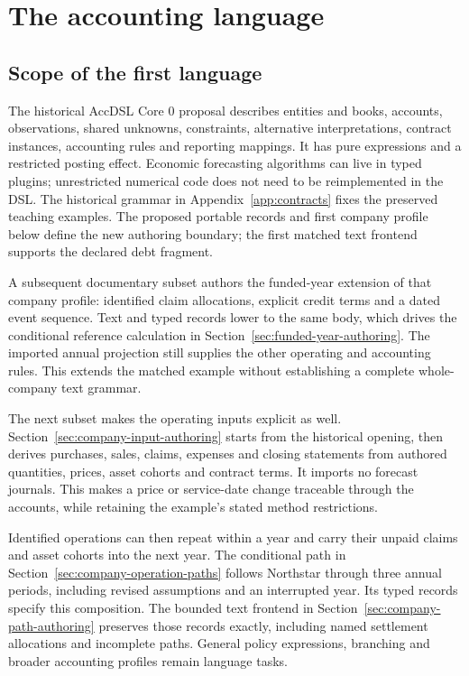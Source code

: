 \chapter{The accounting language}
\label{ch:language}

\section{Scope of the first language}

The historical AccDSL Core 0 proposal describes entities and books, accounts, observations, shared
unknowns, constraints, alternative interpretations, contract instances,
accounting rules and reporting mappings. It has pure expressions and a
restricted posting effect. Economic forecasting algorithms can live in typed
plugins; unrestricted numerical code does not need to be reimplemented in
the DSL. The historical grammar in Appendix~\ref{app:contracts} fixes the preserved
teaching examples. The proposed portable records and first company profile
below define the new authoring boundary; the first matched text frontend
supports the declared debt fragment.

A subsequent documentary subset authors the funded-year extension of that
company profile: identified claim allocations, explicit credit terms and a
dated event sequence. Text and typed records lower to the same body, which
drives the conditional reference calculation in
Section~\ref{sec:funded-year-authoring}. The imported annual projection still
supplies the other operating and accounting rules. This extends the matched
example without establishing a complete whole-company text grammar.

The next subset makes the operating inputs explicit as well.
Section~\ref{sec:company-input-authoring} starts from the historical opening,
then derives purchases, sales, claims, expenses and closing statements from
authored quantities, prices, asset cohorts and contract terms. It imports no
forecast journals. This makes a price or service-date change traceable through
the accounts, while retaining the example's stated method restrictions.

Identified operations can then repeat within a year and carry their unpaid
claims and asset cohorts into the next year. The conditional path in
Section~\ref{sec:company-operation-paths} follows Northstar through three
annual periods, including revised assumptions and an interrupted year.
Its typed records specify this composition. The bounded text frontend in
Section~\ref{sec:company-path-authoring} preserves those records exactly,
including named settlement allocations and incomplete paths. General policy
expressions, branching and broader accounting profiles remain language tasks.

